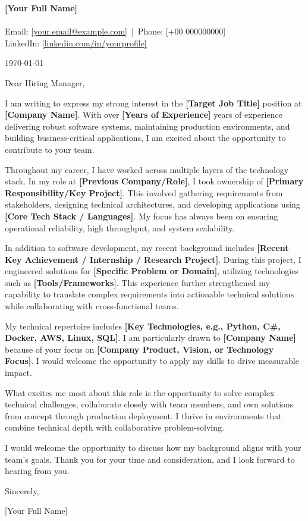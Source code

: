 \documentclass[11pt,a4paper]{article}
\makeatletter
\newcommand{\ApplicantName}{[Your Full Name]}
\newcommand{\ApplicantLocation}{[City, Country]}
\newcommand{\ApplicantEmail}{[your.email@example.com]}
\newcommand{\ApplicantPhone}{[+00 000000000]}
\newcommand{\ApplicantLinkedIn}{[linkedin.com/in/yourprofile]}
\makeatother
\begin{document}
\pagestyle{empty}

{\Large \textbf{\ApplicantName}} \\
\ApplicantLocation \\
Email: \href{mailto:\ApplicantEmail}{\ApplicantEmail} \,|\, Phone: \ApplicantPhone \\
LinkedIn: \href{https://\ApplicantLinkedIn}{\ApplicantLinkedIn}

\vspace{1.5em}

\today

\vspace{1em}

Dear Hiring Manager,

I am writing to express my strong interest in the \textbf{[Target Job Title]} position at \textbf{[Company Name]}. With over \textbf{[Years of Experience]} years of experience delivering robust software systems, maintaining production environments, and building business-critical applications, I am excited about the opportunity to contribute to your team.

Throughout my career, I have worked across multiple layers of the technology stack. In my role at \textbf{[Previous Company/Role]}, I took ownership of \textbf{[Primary Responsibility/Key Project]}. This involved gathering requirements from stakeholders, designing technical architectures, and developing applications using \textbf{[Core Tech Stack / Languages]}. My focus has always been on ensuring operational reliability, high throughput, and system scalability.

In addition to software development, my recent background includes \textbf{[Recent Key Achievement / Internship / Research Project]}. During this project, I engineered solutions for \textbf{[Specific Problem or Domain]}, utilizing technologies such as \textbf{[Tools/Frameworks]}. This experience further strengthened my capability to translate complex requirements into actionable technical solutions while collaborating with cross-functional teams.

My technical repertoire includes \textbf{[Key Technologies, e.g., Python, C\#, Docker, AWS, Linux, SQL]}. I am particularly drawn to \textbf{[Company Name]} because of your focus on \textbf{[Company Product, Vision, or Technology Focus]}. I would welcome the opportunity to apply my skills to drive measurable impact.

What excites me most about this role is the opportunity to solve complex technical challenges, collaborate closely with team members, and own solutions from concept through production deployment. I thrive in environments that combine technical depth with collaborative problem-solving.

I would welcome the opportunity to discuss how my background aligns with your team's goals. Thank you for your time and consideration, and I look forward to hearing from you.

\vspace{1.5em}

Sincerely,

\vspace{1em}

\ApplicantName
\end{document}
